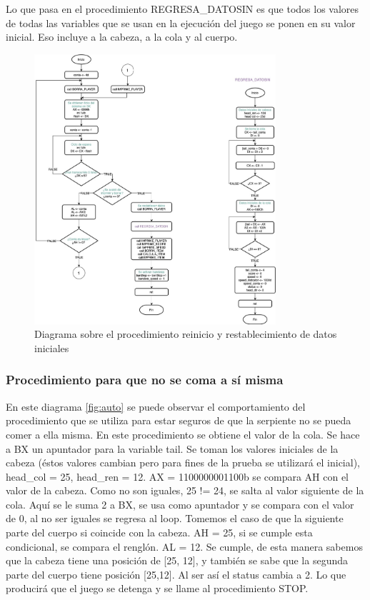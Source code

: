\documentclass[12pt]{article}
\begin{document}
Lo que pasa en el procedimiento REGRESA\_DATOSIN es que todos los valores de todas las variables que se usan en la ejecución del juego se ponen en su valor inicial. Eso incluye a la cabeza, a la cola y al cuerpo. 

\begin{figure}
    \centering
    \includegraphics[height= 10cm]{img/diagramas/06DiagramaStop.jpg}
    \caption{Diagrama sobre el procedimiento reinicio y restablecimiento de datos iniciales}
    \label{fig:stop}
\end{figure}

\subsubsection*{Procedimiento para que no se coma a sí misma}
 En este diagrama \ref{fig:auto} se puede observar el comportamiento del procedimiento que se utiliza para estar seguros de que la serpiente no se pueda comer a ella misma. En este procedimiento se obtiene el valor de la cola. Se hace a BX un apuntador para la variable tail. Se toman los valores iniciales de la cabeza (éstos valores cambian pero para fines de la prueba se utilizará el inicial), head\_col = 25, head\_ren = 12. AX = 1100000001100b se compara AH con el valor de la cabeza. Como no son iguales, 25 != 24, se salta al valor siguiente de la cola. Aquí se le suma 2 a BX, se usa como apuntador y se compara con el valor de 0, al no ser iguales se regresa al loop. Tomemos el caso de que la siguiente parte del cuerpo si coincide con la cabeza. AH = 25, si se cumple esta condicional, se compara el renglón. AL = 12. Se cumple, de esta manera sabemos que la cabeza tiene una posición de [25, 12], y también se sabe que la segunda parte del cuerpo tiene posición [25,12]. Al ser así el status cambia a 2. Lo que producirá que el juego se detenga y se llame al procedimiento STOP.   
 
\end{document}
